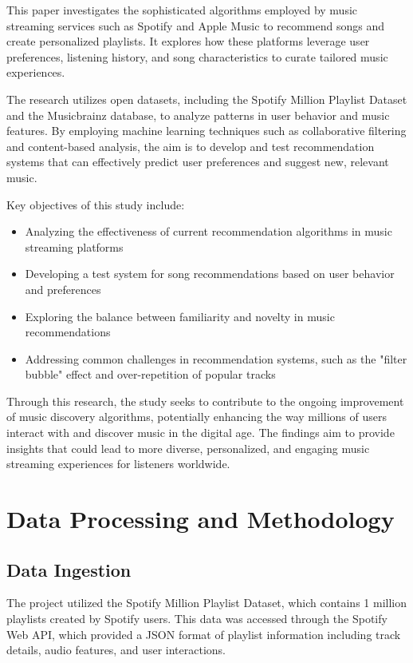 \documentclass[runningheads]{llncs}
\begin{document}
This paper investigates the sophisticated algorithms employed by music streaming services such as Spotify and Apple Music to recommend songs and create personalized playlists. It explores how these platforms leverage user preferences, listening history, and song characteristics to curate tailored music experiences.

The research utilizes open datasets, including the Spotify Million Playlist Dataset and the Musicbrainz database, to analyze patterns in user behavior and music features. By employing machine learning techniques such as collaborative filtering and content-based analysis, the aim is to develop and test recommendation systems that can effectively predict user preferences and suggest new, relevant music.

Key objectives of this study include:
\begin{itemize}
    \item Analyzing the effectiveness of current recommendation algorithms in music streaming platforms
    \item Developing a test system for song recommendations based on user behavior and preferences
    \item Exploring the balance between familiarity and novelty in music recommendations
    \item Addressing common challenges in recommendation systems, such as the "filter bubble" effect and over-repetition of popular tracks
\end{itemize}

Through this research, the study seeks to contribute to the ongoing improvement of music discovery algorithms, potentially enhancing the way millions of users interact with and discover music in the digital age. The findings aim to provide insights that could lead to more diverse, personalized, and engaging music streaming experiences for listeners worldwide.

\section{Data Processing and Methodology}

\subsection{Data Ingestion}
The project utilized the Spotify Million Playlist Dataset, which contains 1 million playlists created by Spotify users. This data was accessed through the Spotify Web API, which provided a JSON format of playlist information including track details, audio features, and user interactions.
\end{document}
